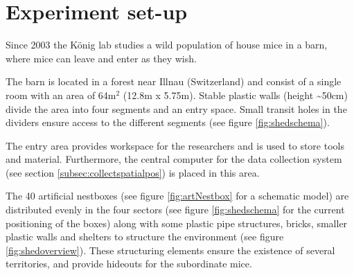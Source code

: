 \newpage
\section{Experiment set-up}
\label{sec:shedsetup}

Since 2003 the K\"onig lab studies a wild population of house mice in a barn, where mice can leave and enter as they wish.

The barn is located in a forest near Illnau (Switzerland) and consist of a single room with an area of 64m$^2$ (12.8m x 5.75m). Stable plastic walls (height \textasciitilde50cm) divide the area into four segments and an entry space. Small transit holes in the dividers ensure access to the different segments (see figure \ref{fig:shedschema}).

The entry area provides workspace for the researchers and is used to store tools and material. Furthermore, the central computer for the data collection system (see section \ref{subsec:collectspatialpos}) is placed in this area.

The 40 artificial nestboxes (see figure \ref{fig:artNestbox} for a schematic model) are distributed evenly in the four sectors (see figure \ref{fig:shedschema} for the current positioning of the boxes) along with some plastic pipe structures, bricks, smaller plastic walls and shelters to structure the environment (see figure \ref{fig:shedoverview}). These structuring elements ensure the existence of several territories, and provide hideouts for the subordinate mice.

